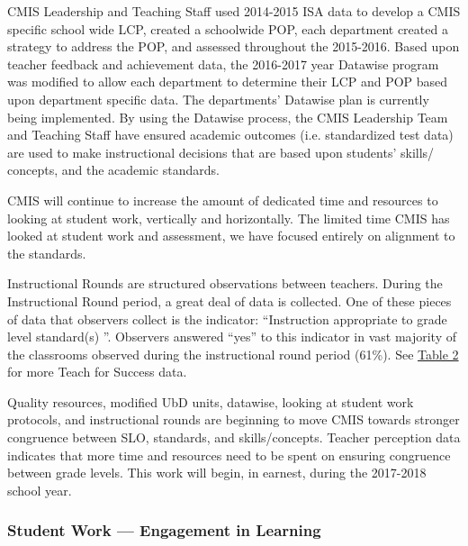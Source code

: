 \begin{findings}
CMIS Leadership and Teaching Staff used 2014-2015 ISA data to develop a CMIS specific school wide LCP, created a schoolwide POP, each department created a strategy to address the POP, and assessed throughout the 2015-2016. Based upon teacher feedback and achievement data, the 2016-2017 year Datawise program was modified to allow each department to determine their LCP and POP based upon department specific data. The departments’ Datawise plan is currently being implemented. By using the Datawise process, the CMIS Leadership Team and Teaching Staff have ensured academic outcomes (i.e. standardized test data) are used to make instructional decisions that are based upon students’ skills/ concepts, and the academic standards. 


CMIS will continue to increase the amount of  dedicated time and resources to looking at student work, vertically and horizontally. The limited time CMIS has looked at student work and assessment, we have focused entirely on alignment to the standards. 


Instructional Rounds are structured observations between teachers. During the Instructional Round period, a great deal of data is collected. One of these pieces of data that observers collect is the indicator:  “Instruction appropriate to grade level standard(s) ”. Observers answered “yes” to this  indicator in vast majority of the classrooms observed during the instructional round period (61\%). See \href{https://docs.google.com/a/cmis.ac.th/document/d/1cRvL50iIDvo8s1Gnxoczm82LhSVmEOvCrFksxzHD7ko/edit?usp=sharing}{Table 2} for more Teach for Success data. 


Quality resources, modified UbD units, datawise, looking at student work protocols, and instructional rounds are beginning to move CMIS towards stronger congruence between SLO, standards, and skills/concepts. Teacher perception data indicates that more time and resources need to be spent on ensuring congruence between grade levels. This work will begin, in earnest, during the 2017-2018 school year. 
\end{findings}

\subsubsection{Student Work — Engagement in Learning}

